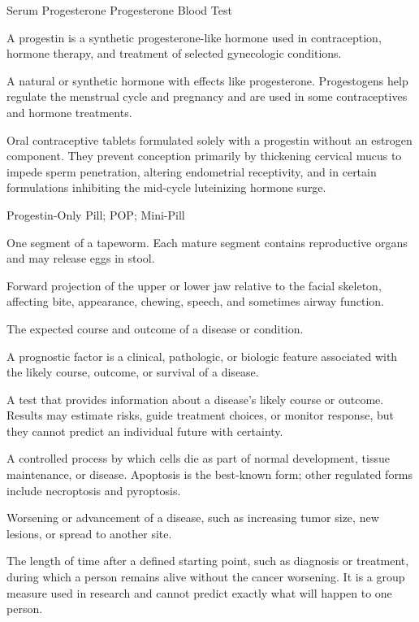 \synonyms
Serum Progesterone
Progesterone Blood Test

 A progestin is a synthetic progesterone-like hormone used in contraception, hormone therapy, and treatment of selected gynecologic conditions.

 A natural or synthetic hormone with effects like progesterone. Progestogens help regulate the menstrual cycle and pregnancy and are used in some contraceptives and hormone treatments.

 Oral contraceptive tablets formulated solely with a progestin without an estrogen component. They prevent conception primarily by thickening cervical mucus to impede sperm penetration, altering endometrial receptivity, and in certain formulations inhibiting the mid-cycle luteinizing hormone surge.

\synonyms
Progestin-Only Pill; POP; Mini-Pill

 One segment of a tapeworm. Each mature segment contains reproductive organs and may release eggs in stool.

 Forward projection of the upper or lower jaw relative to the facial skeleton, affecting bite, appearance, chewing, speech, and sometimes airway function.

 The expected course and outcome of a disease or condition.

 A prognostic factor is a clinical, pathologic, or biologic feature associated with the likely course, outcome, or survival of a disease.

 A test that provides information about a disease's likely course or outcome. Results may estimate risks, guide treatment choices, or monitor response, but they cannot predict an individual future with certainty.

 A controlled process by which cells die as part of normal development, tissue maintenance, or disease. Apoptosis is the best-known form; other regulated forms include necroptosis and pyroptosis.

 Worsening or advancement of a disease, such as increasing tumor size, new lesions, or spread to another site.

 The length of time after a defined starting point, such as diagnosis or treatment, during which a person remains alive without the cancer worsening. It is a group measure used in research and cannot predict exactly what will happen to one person.

